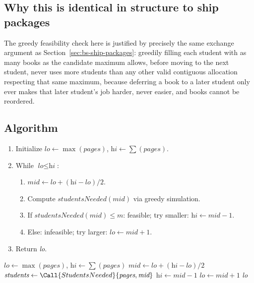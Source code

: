 \subsection*{Why this is identical in structure to ship packages}

The greedy feasibility check here is justified by precisely the same
exchange argument as Section~\ref{sec:bs-ship-packages}: greedily filling
each student with as many books as the candidate maximum allows, before
moving to the next student, never uses more students than any other valid
contiguous allocation respecting that same maximum, because deferring a
book to a later student only ever makes that later student's job harder,
never easier, and books cannot be reordered.

\subsection*{Algorithm}

\begin{enumerate}
  \item Initialize $\textit{lo} \gets \max(\textit{pages})$,
        $\textit{hi} \gets \sum(\textit{pages})$.
  \item While $\textit{lo} \le \textit{hi}$:
  \begin{enumerate}
    \item $\textit{mid} \gets \textit{lo}+(\textit{hi}-\textit{lo})/2$.
    \item Compute $\textit{studentsNeeded}(\textit{mid})$ via greedy
          simulation.
    \item If $\textit{studentsNeeded}(\textit{mid}) \le m$: feasible; try
          smaller: $\textit{hi} \gets \textit{mid}-1$.
    \item Else: infeasible; try larger: $\textit{lo} \gets \textit{mid}+1$.
  \end{enumerate}
  \item Return \textit{lo}.
\end{enumerate}

\begin{algorithm}[H]
\caption{Book Allocation}
\begin{algorithmic}[1]
  \State $\textit{lo} \gets \max(\textit{pages})$, $\textit{hi} \gets \sum(\textit{pages})$
    \State $\textit{mid} \gets \textit{lo}+(\textit{hi}-\textit{lo})/2$
    \State $\textit{students} \gets \Call{StudentsNeeded}{\textit{pages}, \textit{mid}}$
      \State $\textit{hi} \gets \textit{mid} - 1$
    \Else
      \State $\textit{lo} \gets \textit{mid} + 1$
    \EndIf
  \EndWhile
  \State \Return \textit{lo}
\EndProcedure
\end{algorithmic}
\end{algorithm}

